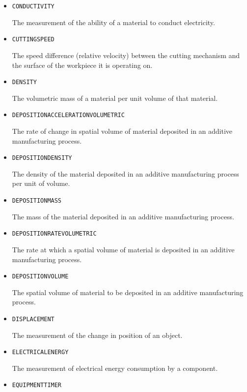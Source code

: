 \begin{itemize}
\item \texttt{CONDUCTIVITY}  

The measurement of the ability of a material to conduct electricity.


\item \texttt{CUTTING\textunderscore SPEED}  

The speed difference (relative velocity) between the cutting mechanism and the surface of the workpiece it is operating on.


\item \texttt{DENSITY}  

The volumetric mass of a material per unit volume of that material.


\item \texttt{DEPOSITION\textunderscore ACCELERATION\textunderscore VOLUMETRIC}  

The rate of change in spatial volume of material deposited in an additive manufacturing process.


\item \texttt{DEPOSITION\textunderscore DENSITY}  

The density of the material deposited in an additive manufacturing process per unit of volume.


\item \texttt{DEPOSITION\textunderscore MASS}  

The mass of the material deposited in an additive manufacturing process.


\item \texttt{DEPOSITION\textunderscore RATE\textunderscore VOLUMETRIC}  

The rate at which a spatial volume of material is deposited in an additive manufacturing process.


\item \texttt{DEPOSITION\textunderscore VOLUME}  

The spatial volume of material to be deposited in an additive manufacturing process.


\item \texttt{DISPLACEMENT}  

The measurement of the change in position of an object.


\item \texttt{ELECTRICAL\textunderscore ENERGY}  

The measurement of electrical energy consumption by a component.


\item \texttt{EQUIPMENT\textunderscore TIMER}  


\end{itemize}
